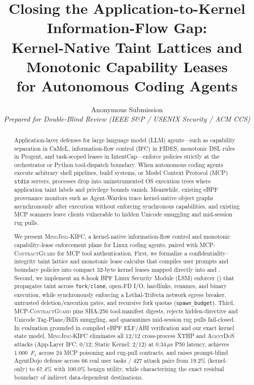 \documentclass[10pt,twocolumn,letterpaper]{article}
\title{\Large \bf Closing the Application-to-Kernel Information-Flow Gap:\\
Kernel-Native Taint Lattices and Monotonic Capability Leases\\
for Autonomous Coding Agents}
\author{
  Anonymous Submission\\
  \textit{Prepared for Double-Blind Review (IEEE S\&P / USENIX Security / ACM CCS)}
}
\date{}
\newcommand{\sys}{\textsc{MingJing-KIFC}}
\newcommand{\guard}{\textsc{MCP-ContractGuard}}
\newcommand{\code}[1]{\texttt{\small #1}}
\begin{document}
\maketitle

\begin{abstract}
Application-layer defenses for large language model (LLM) agents---such as capability separation in CaMeL, information-flow control (IFC) in FIDES, monotonic DSL rules in Progent, and task-scoped leases in IntentCap---enforce policies strictly at the orchestrator or Python tool-dispatch boundary. When autonomous coding agents execute arbitrary shell pipelines, build systems, or Model Context Protocol (MCP) \code{stdio} servers, processes drop into uninstrumented OS execution trees where application taint labels and privilege bounds vanish. Meanwhile, existing eBPF provenance monitors such as Agent-Warden trace kernel-native object graphs asynchronously after execution without enforcing synchronous capabilities, and existing MCP scanners leave clients vulnerable to hidden Unicode smuggling and mid-session rug pulls.

We present \sys{}, a kernel-native information-flow control and monotonic capability-lease enforcement plane for Linux coding agents, paired with \guard{} for MCP tool authentication. First, we formalize a confidentiality--integrity taint lattice and monotonic lease calculus that compiles user prompts and boundary policies into compact 32-byte kernel leases mapped directly into  and . Second, we implement an 8-hook BPF Linux Security Module (LSM) enforcer () that propagates taint across \code{fork}/\code{clone}, open-FD I/O, hardlinks, renames, and binary execution, while synchronously enforcing a Lethal-Trifecta network egress breaker, untrusted deletion/execution gates, and recursive fork quotas (\code{spawn\_budget}). Third, \guard{} pins SHA-256 tool-manifest digests, rejects hidden-directive and Unicode Tag-Plane/BiDi smuggling, and quarantines mid-session rug pulls fail-closed. In evaluation grounded in compiled eBPF ELF/ABI verification and our exact kernel state model, \sys{} eliminates all 12/12 cross-process XTHP and \textsc{AgentDoS} attacks (App-Layer IFC: 0/12; Static Kernel: 2/12) at 0.34\,$\mu$s P50 latency, achieves 1.000~$F_1$ across 24 MCP poisoning and rug-pull contracts, and raises prompt-blind AgentDojo defense across 66 real user tasks / 427 attack pairs from 19.2\% (kernel-only) to 67.4\% with 100.0\% benign utility, while characterizing the exact residual boundary of indirect data-dependent destinations.
\end{abstract}
\end{document}
